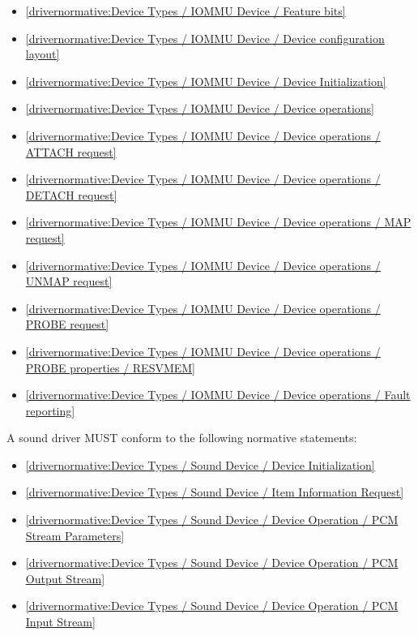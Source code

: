 \begin{itemize}
\item \ref{drivernormative:Device Types / IOMMU Device / Feature bits}
\item \ref{drivernormative:Device Types / IOMMU Device / Device configuration layout}
\item \ref{drivernormative:Device Types / IOMMU Device / Device Initialization}
\item \ref{drivernormative:Device Types / IOMMU Device / Device operations}
\item \ref{drivernormative:Device Types / IOMMU Device / Device operations / ATTACH request}
\item \ref{drivernormative:Device Types / IOMMU Device / Device operations / DETACH request}
\item \ref{drivernormative:Device Types / IOMMU Device / Device operations / MAP request}
\item \ref{drivernormative:Device Types / IOMMU Device / Device operations / UNMAP request}
\item \ref{drivernormative:Device Types / IOMMU Device / Device operations / PROBE request}
\item \ref{drivernormative:Device Types / IOMMU Device / Device operations / PROBE properties / RESVMEM}
\item \ref{drivernormative:Device Types / IOMMU Device / Device operations / Fault reporting}
\end{itemize}

\label{sec:Conformance / Driver Conformance / Sound Driver Conformance}

A sound driver MUST conform to the following normative statements:

\begin{itemize}
\item \ref{drivernormative:Device Types / Sound Device / Device Initialization}
\item \ref{drivernormative:Device Types / Sound Device / Item Information Request}
\item \ref{drivernormative:Device Types / Sound Device / Device Operation / PCM Stream Parameters}
\item \ref{drivernormative:Device Types / Sound Device / Device Operation / PCM Output Stream}
\item \ref{drivernormative:Device Types / Sound Device / Device Operation / PCM Input Stream}
\end{itemize}

